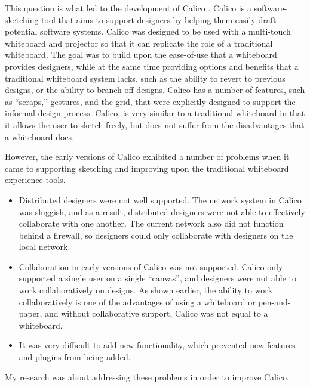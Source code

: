 This question is what led to the development of Calico \cite{calico2}. 
Calico is a software-sketching tool that aims to support designers by helping them easily draft potential software systems. 
Calico was designed to be used with a multi-touch whiteboard and projector so that it can replicate the role of a traditional whiteboard. 
The goal was to build upon the ease-of-use that a whiteboard provides designers, while at the same time providing options and benefits that a traditional whiteboard system lacks, such as the ability to revert to previous designs, or the ability to branch off designs. 
Calico has a number of features, such as ``scraps,'' gestures, and the grid, that were explicitly designed to support the informal design process.
Calico, is very similar to a traditional whiteboard in that it allows the user to sketch freely, but does not suffer from the disadvantages that a whiteboard does.


However, the early versions of Calico exhibited a number of problems when it came to supporting sketching and improving upon the traditional whiteboard experience tools.
\begin{itemize}\itemsep1pt
\item 
Distributed designers were not well supported.
The network system in Calico was sluggish, and as a result, distributed designers were not able to effectively collaborate with one another. The current network also did not function behind a firewall, so designers could only collaborate with designers on the local network.

\item 
Collaboration in early versions of Calico was not supported. 
Calico only supported a single user on a single ``canvas'', and designers were not able to work collaboratively on designs. 
As shown earlier, the ability to work collaboratively is one of the advantages of using a whiteboard or pen-and-paper, and without collaborative support, Calico was not equal to a whiteboard.

\item
It was very difficult to add new functionality, which prevented new features and plugins from being added. 

\end{itemize}
My research was about addressing these problems in order to improve Calico.

